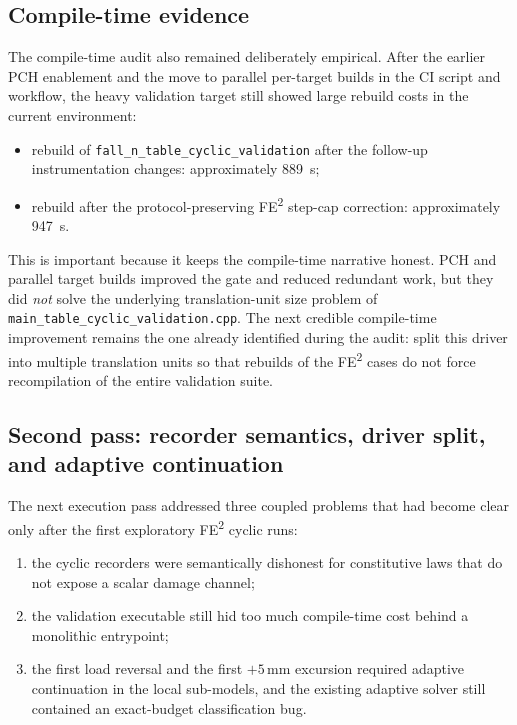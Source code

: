 \subsection{Compile-time evidence}

The compile-time audit also remained deliberately empirical.  After the earlier
PCH enablement and the move to parallel per-target builds in the CI script and
workflow, the heavy validation target still showed large rebuild costs in the
current environment:
\begin{itemize}
  \item rebuild of \texttt{fall\_n\_table\_cyclic\_validation} after the
    follow-up instrumentation changes: approximately 889~s;
  \item rebuild after the protocol-preserving FE\textsuperscript{2} step-cap
    correction: approximately 947~s.
\end{itemize}

This is important because it keeps the compile-time narrative honest.  PCH and
parallel target builds improved the gate and reduced redundant work, but they
did \emph{not} solve the underlying translation-unit size problem of
\texttt{main\_table\_cyclic\_validation.cpp}.  The next credible compile-time
improvement remains the one already identified during the audit: split this
driver into multiple translation units so that rebuilds of the FE\textsuperscript{2}
cases do not force recompilation of the entire validation suite.

\subsection{Second pass: recorder semantics, driver split, and adaptive continuation}

The next execution pass addressed three coupled problems that had become clear
only after the first exploratory FE\textsuperscript{2} cyclic runs:
\begin{enumerate}
  \item the cyclic recorders were semantically dishonest for constitutive laws
    that do not expose a scalar damage channel;
  \item the validation executable still hid too much compile-time cost behind a
    monolithic entrypoint;
  \item the first load reversal and the first \(+5\)\,mm excursion required
    adaptive continuation in the local sub-models, and the existing adaptive
    solver still contained an exact-budget classification bug.
\end{enumerate}

